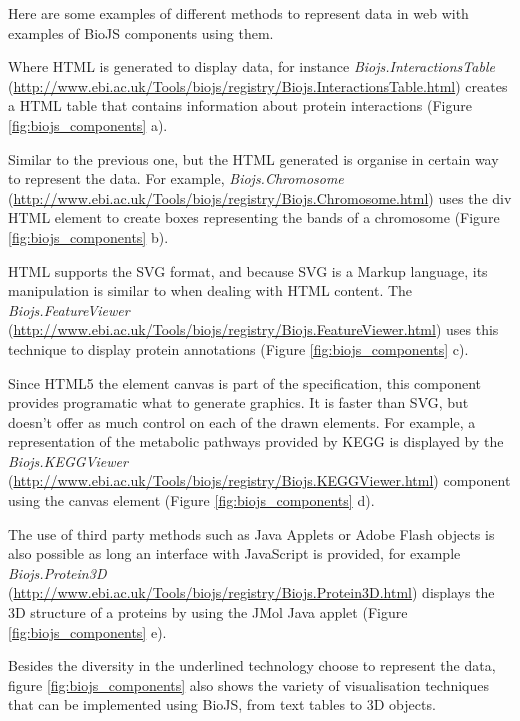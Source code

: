 Here are some examples of different methods to represent data in web with examples of BioJS components using them.
\begin{description}
\setlength\itemsep{-0.3em}
\item[HTML documents] Where HTML is generated to display data, for instance \emph{Biojs.InteractionsTable} (\url{http://www.ebi.ac.uk/Tools/biojs/registry/Biojs.InteractionsTable.html}) creates a HTML table that contains information about protein interactions (Figure \ref{fig:biojs_components} a).
\item[Visualizations using HTML elements] Similar to the previous one, but the HTML generated is organise in certain way to represent the data. For example,  \emph{Biojs.Chromosome} (\url{http://www.ebi.ac.uk/Tools/biojs/registry/Biojs.Chromosome.html}) uses the div HTML element to create boxes representing the bands of a chromosome (Figure \ref{fig:biojs_components} b).
\item[Scalable Vector Graphics] HTML supports the SVG format, and because SVG is a Markup language, its manipulation is similar to when dealing with HTML content. The \emph{Biojs.FeatureViewer} (\url{http://www.ebi.ac.uk/Tools/biojs/registry/Biojs.FeatureViewer.html}) uses this technique to display protein annotations (Figure \ref{fig:biojs_components} c).
\item[HTML canvas] Since HTML5 the element canvas is part of the specification, this component provides programatic what to generate graphics. It is faster than SVG, but doesn't offer as much control on each of the drawn elements. For example, a representation of the metabolic pathways provided by KEGG is displayed by the \emph{Biojs.KEGGViewer} (\url{http://www.ebi.ac.uk/Tools/biojs/registry/Biojs.KEGGViewer.html}) component using the canvas element (Figure \ref{fig:biojs_components} d).
\item[Browser plugins] The use of third party methods such as Java Applets or Adobe Flash objects is also possible as long an interface with JavaScript is provided, for example \emph{Biojs.Protein3D} (\url{http://www.ebi.ac.uk/Tools/biojs/registry/Biojs.Protein3D.html}) displays the 3D structure of a proteins by using the JMol Java applet (Figure \ref{fig:biojs_components} e).
\end{description}

Besides the diversity in the underlined technology choose to represent the data, figure \ref{fig:biojs_components} also shows the variety of visualisation techniques that can be implemented using BioJS, from text tables to 3D objects.

